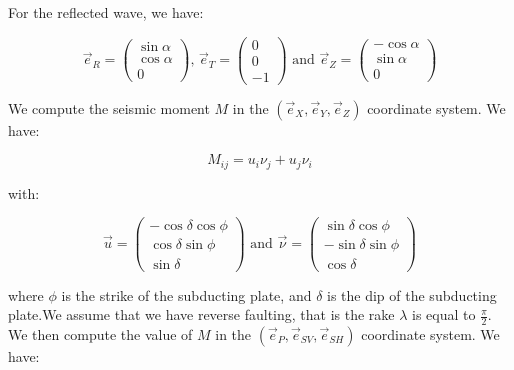 \documentclass[workdone.tex]{subfiles}
\begin{document}
For the reflected wave, we have:

\begin{equation}
\vec{e}_R = \begin{pmatrix}
\sin \alpha \\
\cos \alpha \\
0
\end{pmatrix} \text{, } \vec{e}_T = \begin{pmatrix}
0 \\
0 \\
- 1
\end{pmatrix} \text{ and } \vec{e}_Z = \begin{pmatrix}
- \cos \alpha \\
\sin \alpha \\
0
\end{pmatrix}
\end{equation}

We compute the seismic moment $M$ in the $\left( \vec{e}_X, \vec{e}_Y, \vec{e}_Z \right)$ coordinate system. We have:

\begin{equation}
M_{ij} = u_i \nu_j + u_j \nu_i
\end{equation}

with:

\begin{equation}
\vec{u} = \begin{pmatrix}
- \cos \delta \cos \phi \\
\cos \delta \sin \phi \\
\sin \delta
\end{pmatrix} \text{ and } \vec{\nu} = \begin{pmatrix}
\sin \delta \cos \phi \\
- \sin \delta \sin \phi \\
\cos \delta 
\end{pmatrix}
\end{equation}

where $\phi$ is the strike of the subducting plate, and $\delta$ is the dip of the subducting plate.We assume that we have reverse faulting, that is the rake $\lambda$ is equal to $\frac{\pi}{2}$. \\

We then compute the value of $M$ in the $(\vec{e}_P, \vec{e}_{SV}, \vec{e}_{SH})$ coordinate system. We have:
\end{document}
